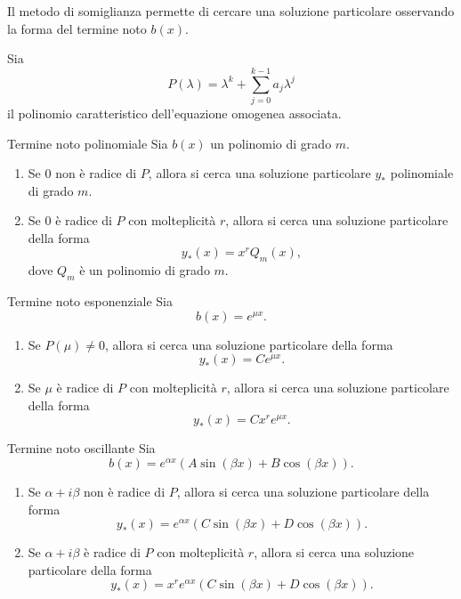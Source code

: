 \documentclass[a4paper]{article}
\begin{document}
\begin{radioactive}
Il metodo di somiglianza permette di cercare una soluzione particolare osservando la forma del termine noto \(b(x)\).

Sia
\[
    P(\lambda)=\lambda^k+\sum_{j=0}^{k-1}a_j\lambda^j
\]
il polinomio caratteristico dell'equazione omogenea associata.
\end{radioactive}

\begin{radioactive}
\begin{snippetproposition}{Termine noto polinomiale}
    Sia \(b(x)\) un polinomio di grado \(m\).
    \begin{enumerate}
        \item Se \(0\) non è radice di \(P\), allora si cerca una soluzione particolare \(y_\ast\) polinomiale di grado \(m\).
        \item Se \(0\) è radice di \(P\) con molteplicità \(r\), allora si cerca una soluzione particolare della forma
            \[
                y_\ast(x)=x^rQ_m(x),
            \]
            dove \(Q_m\) è un polinomio di grado \(m\).
    \end{enumerate}
\end{snippetproposition}
\end{radioactive}

\begin{radioactive}
\begin{snippetproposition}{Termine noto esponenziale}
    Sia
    \[
        b(x)=e^{\mu x}.
    \]
    \begin{enumerate}
        \item Se \(P(\mu)\neq 0\), allora si cerca una soluzione particolare della forma
            \[
                y_\ast(x)=Ce^{\mu x}.
            \]
        \item Se \(\mu\) è radice di \(P\) con molteplicità \(r\), allora si cerca una soluzione particolare della forma
            \[
                y_\ast(x)=Cx^re^{\mu x}.
            \]
    \end{enumerate}
\end{snippetproposition}
\end{radioactive}

\begin{radioactive}
\begin{snippetproposition}{Termine noto oscillante}
    Sia
    \[
        b(x)=e^{\alpha x}\left(A\sin(\beta x)+B\cos(\beta x)\right).
    \]
    \begin{enumerate}
        \item Se \(\alpha+i\beta\) non è radice di \(P\), allora si cerca una soluzione particolare della forma
            \[
                y_\ast(x)=e^{\alpha x}\left(C\sin(\beta x)+D\cos(\beta x)\right).
            \]
        \item Se \(\alpha+i\beta\) è radice di \(P\) con molteplicità \(r\), allora si cerca una soluzione particolare della forma
            \[
                y_\ast(x)=x^re^{\alpha x}\left(C\sin(\beta x)+D\cos(\beta x)\right).
            \]
    \end{enumerate}
\end{snippetproposition}
\end{radioactive}
\end{document}
